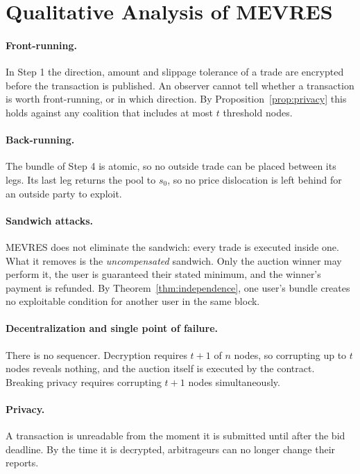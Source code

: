 \section{Qualitative Analysis of MEVRES}

\paragraph{Front-running.} In Step 1 the direction, amount and slippage tolerance of a trade are encrypted before the transaction is published. An observer cannot tell whether a transaction is worth front-running, or in which direction. By Proposition~\ref{prop:privacy} this holds against any coalition that includes at most $t$ threshold nodes.

\paragraph{Back-running.} The bundle of Step 4 is atomic, so no outside trade can be placed between its legs. Its last leg returns the pool to $s_0$, so no price dislocation is left behind for an outside party to exploit.

\paragraph{Sandwich attacks.} MEVRES does not eliminate the sandwich: every trade is executed inside one. What it removes is the \emph{uncompensated} sandwich. Only the auction winner may perform it, the user is guaranteed their stated minimum, and the winner's payment is refunded. By Theorem~\ref{thm:independence}, one user's bundle creates no exploitable condition for another user in the same block.

\paragraph{Decentralization and single point of failure.} There is no sequencer. Decryption requires $t+1$ of $n$ nodes, so corrupting up to $t$ nodes reveals nothing, and the auction itself is executed by the contract. Breaking privacy requires corrupting $t+1$ nodes simultaneously.

\paragraph{Privacy.} A transaction is unreadable from the moment it is submitted until after the bid deadline. By the time it is decrypted, arbitrageurs can no longer change their reports.

